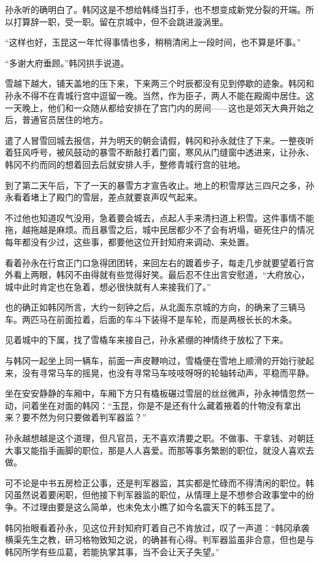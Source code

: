 孙永听的确明白了。韩冈这是不想给韩绛当打手，也不想变成新党分裂的开端。所以打算辞一职，受一职。留在京城中，但不会跳进漩涡里。

“这样也好，玉昆这一年忙得事情也多，稍稍清闲上一段时间，也不算是坏事。”

“多谢大府垂顾。”韩冈拱手说道。

雪越下越大，铺天盖地的压下来，下来两三个时辰都没有见到停歇的迹象。韩冈和孙永不得不在青城行宫中逗留一晚。当然，作为臣子，两人不能在殿阁中居住。这一天晚上，他们和一众随从都给安排在了宫门内的房间——这也是郊天大典开始之后，普通官员居住的地方。

遣了人冒雪回城去报信，并为明天的朝会请假，韩冈和孙永就住了下来。一整夜听着狂风呼号，被风鼓动的暴雪不断敲打着门窗，寒风从门缝窗中透进来，让孙永、韩冈不约而同的想着回去后就安排人手，整修青城行宫的驻地。

到了第二天午后，下了一天的暴雪方才宣告收止。地上的积雪厚达三四尺之多，孙永看着堵上了殿门的雪层，差点就要哀声叹气起来。

不过他也知道叹气没用，急着要会城去，点起人手来清扫道上积雪。这件事情不能拖，越拖越是麻烦。而且暴雪之后，城中民居都少不了会有坍塌，砸死住户的情况每年都没有少过，这些事，都要他这位开封知府来调动、来处置。

看着孙永在行宫正门口急得团团转，来回左右的踱着步子，每走几步就要望着行宫外看上两眼，韩冈不由得就有些觉得好笑。最后忍不住出言安慰道，“大府放心，城中此时肯定也在急着，想必很快就有人来接我们了。”

也的确正如韩冈所言，大约一刻钟之后，从北面东京城的方向，的确来了三辆马车。两匹马在前面拉着，后面的车斗下装得不是车轮，而是两根长长的木条。

见着城中的下属，找了雪橇车来接自己，孙永紧绷的神情终于放松了下来。

与韩冈一起坐上同一辆车，前面一声皮鞭响过，雪橇便在雪地上顺滑的开始行驶起来，没有寻常马车的摇晃，也没有寻常马车吱吱呀呀的轮轴转动声，平稳而平静。

坐在安安静静的车厢中，车厢下方只有橇板碾过雪层的丝丝微声，孙永神情忽然一动，问着坐在对面的韩冈：“玉昆，你是不是还有什么藏着掖着的什物没有拿出来？要不然为何只要做着判军器监？”

孙永越想越是这个道理，但凡官员，无不喜欢清要之职。不做事、干拿钱、对朝廷大事又能指手画脚的职位，那是人人喜爱。而那等事务繁剧的职位，就没人喜欢去做。

可不论是中书五房检正公事，还是判军器监，其实都是忙碌而不得清闲的职位。韩冈虽然说着要闲职，但他接下判军器监的职位，从情理上是不想参合政事堂中的纷争。不过理由要是这么简单，也未免太小瞧了如今名震天下的韩玉昆了。

韩冈抬眼看着孙永，见这位开封知府盯着自己不肯放过，叹了一声道：“韩冈承袭横渠先生之教，研习格物致知之说，的确甚有心得。判军器监虽非合意，但也是与韩冈所学有些瓜葛，若能执掌其事，当不会让天子失望。”

